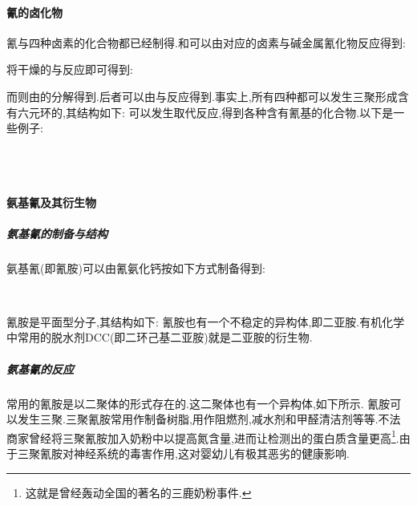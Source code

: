 \documentclass{ctexart}
\begin{document}
\paragraph{氰的卤化物}
氰与四种卤素的化合物都已经制得.和可以由对应的卤素与碱金属氰化物反应得到:
\begin{center}
\end{center}
将干燥的与反应即可得到:
\begin{center}
\end{center}
而则由的分解得到.后者可以由与反应得到.事实上,所有四种都可以发生三聚形成含有六元环的,其结构如下:
可以发生取代反应,得到各种含有氰基的化合物.以下是一些例子:
\begin{center}
    \\
    \\
\end{center}
\paragraph{氨基氰及其衍生物}
\subparagraph{氨基氰的制备与结构}
氨基氰(即氰胺)可以由氰氨化钙按如下方式制备得到:
\begin{center}
    \\
\end{center}
氰胺是平面型分子,其结构如下:
氰胺也有一个不稳定的异构体,即二亚胺.有机化学中常用的脱水剂DCC(即二环己基二亚胺)就是二亚胺的衍生物.
\subparagraph{氨基氰的反应}
\indent 常用的氰胺是以二聚体的形式存在的.这二聚体也有一个异构体,如下所示.
氰胺可以发生三聚.三聚氰胺常用作制备树脂,用作阻燃剂,减水剂和甲醛清洁剂等等.不法商家曾经将三聚氰胺加入奶粉中以提高氮含量,进而让检测出的蛋白质含量更高\footnote{这就是曾经轰动全国的著名的三鹿奶粉事件.}.由于三聚氰胺对神经系统的毒害作用,这对婴幼儿有极其恶劣的健康影响.
\end{document}
